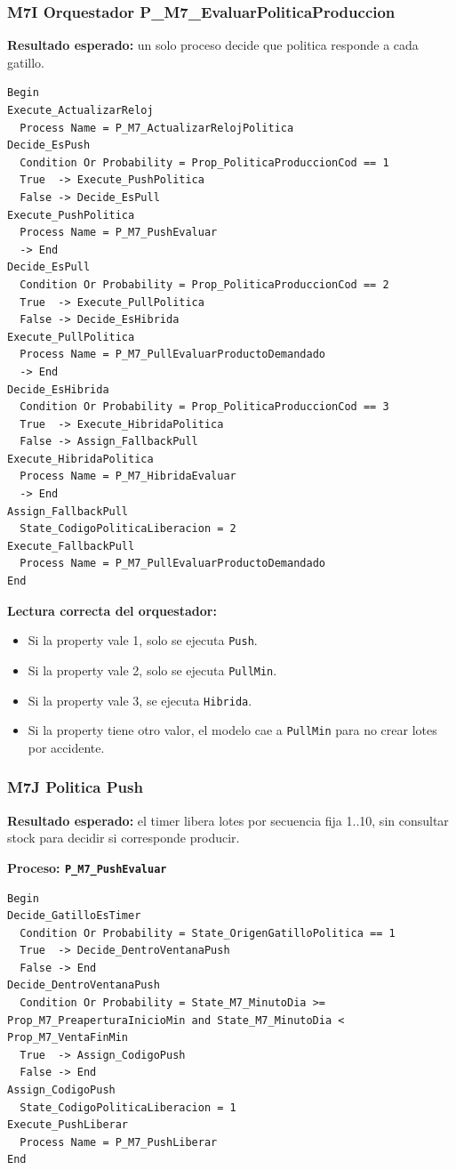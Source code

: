 \documentclass[11pt]{article}
\newcommand{\simio}[1]{\texttt{#1}}
\newcommand{\proc}[1]{\texttt{#1}}
\begin{document}
\subsubsection{M7I Orquestador P\_M7\_EvaluarPoliticaProduccion}
\textbf{Resultado esperado:} un solo proceso decide que politica responde a cada gatillo.

\begin{lstlisting}[caption={Bloques de P M7 EvaluarPoliticaProduccion}]
Begin
Execute_ActualizarReloj
  Process Name = P_M7_ActualizarRelojPolitica
Decide_EsPush
  Condition Or Probability = Prop_PoliticaProduccionCod == 1
  True  -> Execute_PushPolitica
  False -> Decide_EsPull
Execute_PushPolitica
  Process Name = P_M7_PushEvaluar
  -> End
Decide_EsPull
  Condition Or Probability = Prop_PoliticaProduccionCod == 2
  True  -> Execute_PullPolitica
  False -> Decide_EsHibrida
Execute_PullPolitica
  Process Name = P_M7_PullEvaluarProductoDemandado
  -> End
Decide_EsHibrida
  Condition Or Probability = Prop_PoliticaProduccionCod == 3
  True  -> Execute_HibridaPolitica
  False -> Assign_FallbackPull
Execute_HibridaPolitica
  Process Name = P_M7_HibridaEvaluar
  -> End
Assign_FallbackPull
  State_CodigoPoliticaLiberacion = 2
Execute_FallbackPull
  Process Name = P_M7_PullEvaluarProductoDemandado
End
\end{lstlisting}

\textbf{Lectura correcta del orquestador:}
\begin{itemize}
  \item Si la property vale 1, solo se ejecuta \simio{Push}.
  \item Si la property vale 2, solo se ejecuta \simio{PullMin}.
  \item Si la property vale 3, se ejecuta \simio{Hibrida}.
  \item Si la property tiene otro valor, el modelo cae a \simio{PullMin} para no crear lotes por accidente.
\end{itemize}

\subsubsection{M7J Politica Push}
\textbf{Resultado esperado:} el timer libera lotes por secuencia fija 1..10, sin consultar stock para decidir si corresponde producir.

\textbf{Proceso: \proc{P\_M7\_PushEvaluar}}

\begin{lstlisting}[caption={Bloques de P M7 PushEvaluar}]
Begin
Decide_GatilloEsTimer
  Condition Or Probability = State_OrigenGatilloPolitica == 1
  True  -> Decide_DentroVentanaPush
  False -> End
Decide_DentroVentanaPush
  Condition Or Probability = State_M7_MinutoDia >= Prop_M7_PreaperturaInicioMin and State_M7_MinutoDia < Prop_M7_VentaFinMin
  True  -> Assign_CodigoPush
  False -> End
Assign_CodigoPush
  State_CodigoPoliticaLiberacion = 1
Execute_PushLiberar
  Process Name = P_M7_PushLiberar
End
\end{lstlisting}
\end{document}
